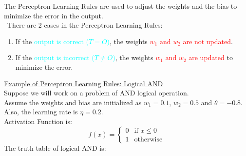 \documentclass{book}
\begin{document}
The Perceptron Learning Rules are used to adjust the weights and the bias to minimize the error in the output.\\\
There are 2 cases in the Perceptron Learning Rules:
\begin{enumerate}
    \item If the \textcolor{cyan}{output is correct (\(T = O\))}, the weights \textcolor{red}{\(w_1 \text{ and } w_2\) are not updated}.
    \item If the \textcolor{cyan}{output is incorrect (\(T \neq O\))}, the weights \textcolor{red}{\(w_1 \text{ and } w_2\) are updated} to minimize the error.
\end{enumerate}
\vspace{2mm}
\underline{Example of Perceptron Learning Rules: Logical AND}\\
Suppose we will work on a problem of AND logical operation.\\
Assume the weights and bias are initialized as \(w_1 = 0.1\), \(w_2 = 0.5\) and \(\theta = -0.8\). Also, the learning rate is \(\eta = 0.2\).\\
Activation Function is:
\[
    f(x) = \begin{cases}
        0 & \text{if } x \leq 0\\
        1 & \text{otherwise}
    \end{cases}
\]
The truth table of logical AND is:\\
\begin{figure}[ht]
    \raggedright
\end{figure}
\end{document}
